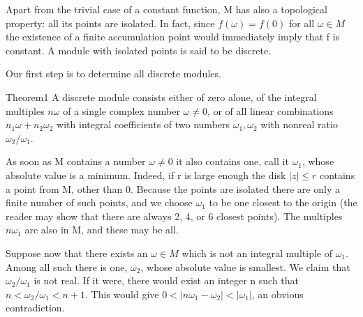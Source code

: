 Apart from the trivial case of a constant function, M has also a topological property: all its points are isolated. In fact, since $f(\omega) = f(0)$ for all $\omega \in M$ the existence of a finite accumulation point would immediately imply that f is constant. A module with isolated points is said to be discrete.

Our first step is to determine all discrete modules.

\begin{originalstatement}{Theorem}{1}\label{thm:7.1}
A discrete module consists either of zero alone, of the integral multiples $n\omega$ of a single complex number $\omega \neq 0$, or of all linear combinations $n_1\omega + n_2\omega_2$ with integral coefficients of two numbers $\omega_1, \omega_2$ with nonreal ratio $\omega_2 / \omega_1$.
\end{originalstatement}
As soon as M contains a number $\omega \neq 0$ it also contains one, call it $\omega_{1}$, whose absolute value is a minimum. Indeed, if r is large enough the
disk $|z| \leq r$ contains a point from M, other than 0. Because the points are isolated there are only a finite number of such points, and we choose $\omega_{1}$ to be one closest to the origin (the reader may show that there are always 2, 4, or 6 closest points). The multiples $n\omega_{1}$ are also in M, and these may be all.

Suppose now that there exists an $\omega \in M$ which is not an integral multiple of $\omega_{1}$. Among all such there is one, $\omega_{2}$, whose absolute value is smallest. We claim that $\omega_{2}/\omega_{1}$ is not real. If it were, there would exist an integer n such that $n < \omega_{2}/\omega_{1} < n + 1$. This would give $0 < |n\omega_{1} - \omega_{2}| < |\omega_{1}|$, an obvious contradiction.

